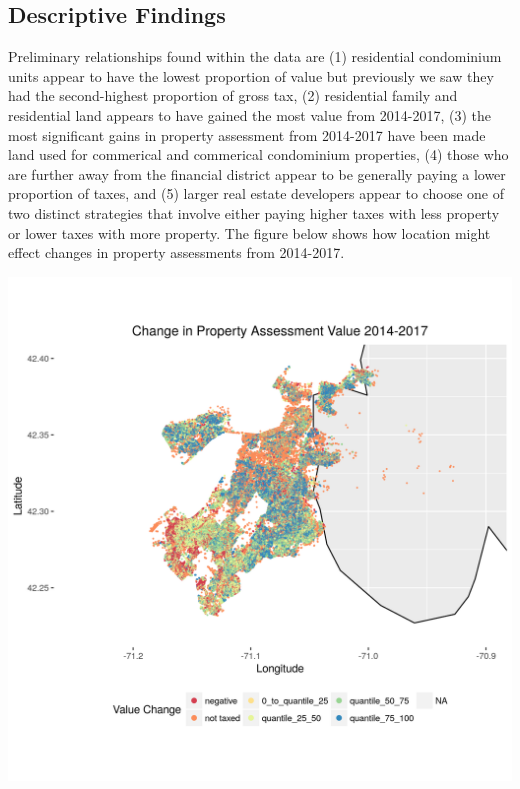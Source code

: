 \documentclass[12pt]{article}
\begin{document}
\subsection*{Descriptive Findings}
Preliminary relationships found within the data are (1) residential 
condominium units appear to have the lowest proportion of value but 
previously we saw they had the second-highest proportion of gross tax,
(2) residential family and residential land appears to have gained the 
most value from 2014-2017, (3) the most significant gains in property
assessment from 2014-2017 have been made land used for commerical and
commerical condominium properties, (4) those who are further away from 
the financial district appear to be generally paying a lower proportion 
of taxes, and (5) larger real estate developers appear to choose one
of two distinct strategies that involve either paying higher taxes with
less property or lower taxes with more property. The figure below shows
how location might effect changes in property assessments from 2014-2017.

\includegraphics[scale=0.75]{property_delta2014-2017}


 

\end{document}
